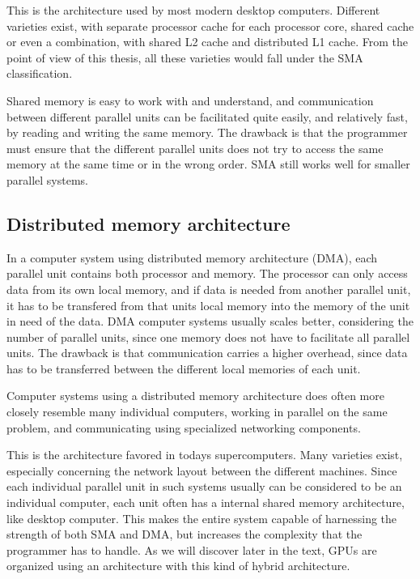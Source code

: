 This is the architecture used by most modern desktop computers. Different varieties exist, with separate processor cache for each processor core, shared cache or even a combination, with shared L2 cache and distributed L1 cache. From the point of view of this thesis, all these varieties would fall under the SMA classification.

Shared memory is easy to work with and understand, and communication between different parallel units can be facilitated quite easily, and relatively fast, by reading and writing the same memory. The drawback is that the programmer must ensure that the different parallel units does not try to access the same memory at the same time or in the wrong order. SMA still works well for smaller parallel systems.

\subsection{Distributed memory architecture} %
\label{sub:distributed_memory_architecture}
In a computer system using distributed memory architecture (DMA), each parallel unit contains both processor and memory. The processor can only access data from its own local memory, and if data is needed from another parallel unit, it has to be transfered from that units local memory into the memory of the unit in need of the data. DMA computer systems usually scales better, considering the number of parallel units, since one memory does not have to facilitate all parallel units. The drawback is that communication carries a higher overhead, since data has to be transferred between the different local memories of each unit.

Computer systems using a distributed memory architecture does often more closely resemble many individual computers, working in parallel on the same problem, and communicating using specialized networking components.

This is the architecture favored in todays supercomputers. Many varieties exist, especially concerning the network layout between the different machines. Since each individual parallel unit in such systems usually can be considered to be an individual computer, each unit often has a internal shared memory architecture, like desktop computer. This makes the entire system capable of harnessing the strength of both SMA and DMA, but increases the complexity that the programmer has to handle. As we will discover later in the text, GPUs are organized using an architecture with this kind of hybrid architecture.

